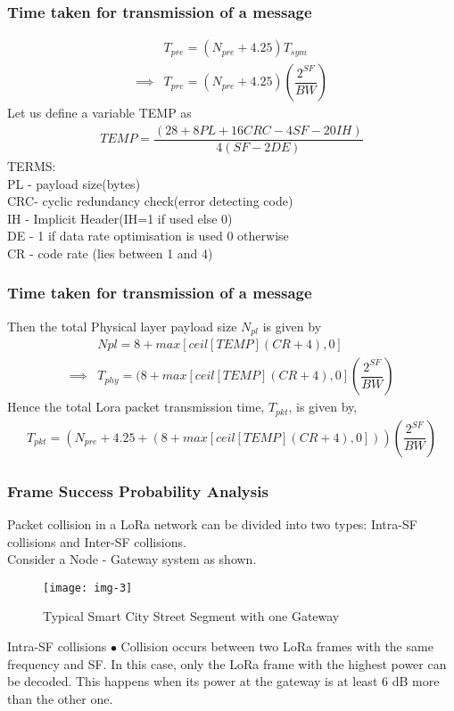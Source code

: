 \documentclass{beamer}
\begin{document}
\begin{frame}
\frametitle{Time taken for transmission of a message}
\begin{align}
&T_{pre}=(N_{pre}+4.25)T_{sym}\\
\implies&T_{pre}=(N_{pre}+4.25)\left(\dfrac{2^{SF}}{BW}\right)
\end{align}
Let us define a variable TEMP as
\begin{align}
TEMP=\dfrac{(28+8PL+16CRC-4SF-20IH)}{4(SF-2DE)}
\end{align}
TERMS:\\
PL - payload size(bytes)\\
CRC- cyclic redundancy check(error detecting code)\\
IH - Implicit Header(IH=1 if used else 0)\\
DE - 1 if data rate optimisation is used 0 otherwise\\ 
CR - code rate (lies between 1 and 4)

\end{frame}


\begin{frame}
\frametitle{Time taken for transmission of a message}
Then the total Physical layer payload size $N_{pl}$ is given by
\begin{align}
&Npl = 8 + max[ceil[TEMP](CR+4),0]\\
\implies & T_{phy}=  (8 + max[ceil[TEMP](CR+4),0]\left(\dfrac{2^{SF}}{BW}\right)
\end{align}
Hence the total Lora packet transmission time, $T_{pkt}$, is given by,
\begin{align}
T_{pkt} =(N_{pre} + 4.25 + (8 + max[ceil[TEMP](CR+4),0]))\left(\dfrac{2^{SF}}{BW}\right)
\end{align}

\end{frame}


\begin{frame}
\frametitle{Frame Success Probability Analysis}
Packet collision in a LoRa network can be divided into two types: Intra-SF collisions and Inter-SF collisions.\\
Consider a Node - Gateway system as shown.
\begin{figure}[h]
    \centering
    \texttt{[image: img-3]}
    \caption{Typical Smart City Street Segment with one Gateway}
\end{figure}
\begin{block}{Intra-SF collisions}
$\bullet$ Collision occurs between two LoRa frames with the same frequency and SF. In this case, only the LoRa frame with the highest power can be decoded. This happens when its power at the gateway is at least 6 dB more than the other one.

\end{block}

\end{frame}
\end{document}
